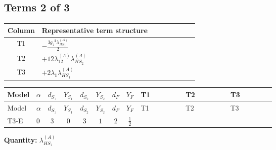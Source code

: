 \documentclass[8pt]{article}
\begin{document}
\begin{landscape}
\subsection*{Terms 2 of 3}
\begin{center}
\begin{tabular}{@{}c >{\raggedright\arraybackslash}p{0.82\linewidth}@{}}
\toprule
Column & Representative term structure \\
\midrule
T1 & \(\displaystyle -\frac{3 {g_1}^2 {\lambda_{HS_1}^{(A)}}}{2}\) \\
\midrule
T2 & \(\displaystyle +12 {\lambda_{12}^{(A)}} {\lambda_{HS_2}^{(A)}}\) \\
\midrule
T3 & \(\displaystyle +2 {\lambda_1} {\lambda_{HS_1}^{(A)}}\) \\
\midrule
\bottomrule
\end{tabular}
\end{center}
\smallskip
\tiny
\begin{longtable}{@{}llcccccc >{\raggedright\arraybackslash}p{0.21\linewidth} >{\raggedright\arraybackslash}p{0.21\linewidth} >{\raggedright\arraybackslash}p{0.21\linewidth}@{}}
\toprule
Model & $\alpha$ & $d_{S_1}$ & $Y_{S_1}$ & $d_{S_2}$ & $Y_{S_2}$ & $d_F$ & $Y_F$ & T1 & T2 & T3 \\
\midrule
\endfirsthead
\toprule
Model & $\alpha$ & $d_{S_1}$ & $Y_{S_1}$ & $d_{S_2}$ & $Y_{S_2}$ & $d_F$ & $Y_F$ & T1 & T2 & T3 \\
\midrule
\endhead
T3-E & $0$ & $3$ & $0$ & $3$ & $1$ & $2$ & $\frac{1}{2}$ & \scriptsize\adjustbox{max width=\linewidth}{$\begin{gathered} -\frac{3 {g_1}^2 {\lambda_{HS_1}^{(A)}}}{2}\end{gathered}$} & \scriptsize\adjustbox{max width=\linewidth}{$\begin{gathered} +12 {\lambda_{12}^{(A)}} {\lambda_{HS_2}^{(A)}}\end{gathered}$} & \scriptsize\adjustbox{max width=\linewidth}{$\begin{gathered} +2 {\lambda_1} {\lambda_{HS_1}^{(A)}}\end{gathered}$} \\
\midrule
\bottomrule
\end{longtable}
\clearpage
\noindent\textbf{Quantity: }$\lambda_{HS_1}^{(A)}$\par\smallskip

\end{landscape}
\end{document}
